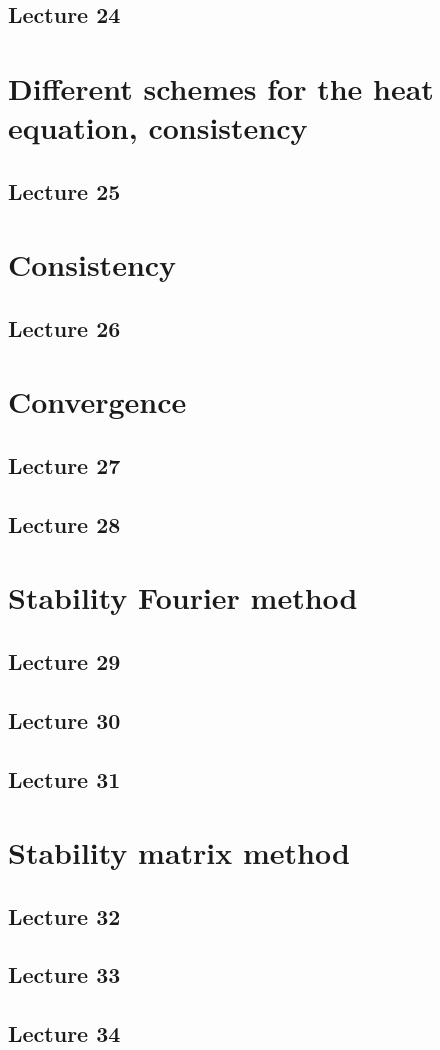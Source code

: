 \documentclass{article}
\begin{document}
\subsection{Lecture 24}


\section{Different schemes for the heat equation, consistency}
\subsection{Lecture 25}


\section{Consistency}
\subsection{Lecture 26}


\section{Convergence}
\subsection{Lecture 27}
\subsection{Lecture 28}


\section{Stability Fourier method}
\subsection{Lecture 29}
\subsection{Lecture 30}
\subsection{Lecture 31}


\section{Stability matrix method}
\subsection{Lecture 32}
\subsection{Lecture 33}
\subsection{Lecture 34}
\end{document}
